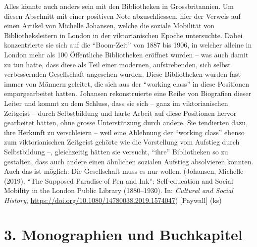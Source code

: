 \documentclass[a4paper,
fontsize=11pt,
oneside,
numbers=noperiodatend,
parskip=half-,
bibliography=totoc,
final
]{scrartcl}
\begin{document}
Alles könnte auch anders sein mit den Bibliotheken in Grossbritannien.
Um diesen Abschnitt mit einer positiven Note abzuschliessen, hier der
Verweis auf einen Artikel von Michelle Johansen, welche die soziale
Mobilität von Bibliotheksleitern in London in der viktorianischen Epoche
untersuchte. Dabei konzentrierte sie sich auf die \enquote{Boom-Zeit}
von 1887 bis 1906, in welcher alleine in London mehr als 100 Öffentliche
Bibliotheken eröffnet wurden -- was auch damit zu tun hatte, dass diese
als Teil einer modernen, aufstrebenden, sich selbst verbessernden
Gesellschaft angesehen wurden. Diese Bibliotheken wurden fast immer von
Männern geleitet, die sich aus der \enquote{working class} in diese
Positionen emporgearbeitet hatten. Johansen rekonstruierte eine Reihe
von Biografien dieser Leiter und kommt zu dem Schluss, dass sie sich --
ganz im viktorianischen Zeitgeist -- durch Selbstbildung und harte
Arbeit auf diese Positionen hervor gearbeitet hätten, ohne grosse
Unterstützung durch andere. Sie tendierten dazu, ihre Herkunft zu
verschleiern -- weil eine Ablehnung der \enquote{working class} ebenso
zum viktorianischen Zeitgeist gehörte wie die Vorstellung vom Aufstieg
durch Selbstbildung --, gleichzeitig hätten sie versucht, \enquote{ihre}
Bibliotheken so zu gestalten, dass auch andere einen ähnlichen sozialen
Aufstieg absolvieren konnten. Auch das ist möglich: Die Gesellschaft
muss es nur wollen. (Johansen, Michelle (2019). \enquote{The Supposed
Paradise of Pen and Ink}: Self-education and Social Mobility in the
London Public Library (1880--1930). In: \emph{Cultural and Social
History}, \url{https://doi.org/10.1080/14780038.2019.1574047})
{[}Paywall{]} (ks)

\hypertarget{monographien-und-buchkapitel}{%
\section{3. Monographien und
Buchkapitel}\label{monographien-und-buchkapitel}}
\end{document}
